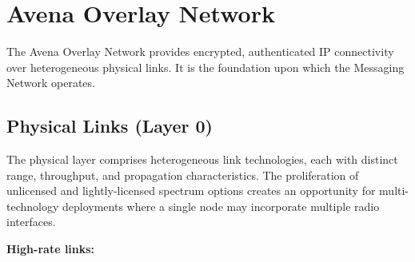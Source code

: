 
\section{Avena Overlay Network}

The Avena Overlay Network provides encrypted, authenticated IP connectivity over heterogeneous physical links. It is the foundation upon which the Messaging Network operates.

\subsection{Physical Links (Layer 0)}

The physical layer comprises heterogeneous link technologies, each with distinct range, throughput, and propagation characteristics. The proliferation of unlicensed and lightly-licensed spectrum options creates an opportunity for multi-technology deployments where a single node may incorporate multiple radio interfaces.

\textbf{High-rate links:}

